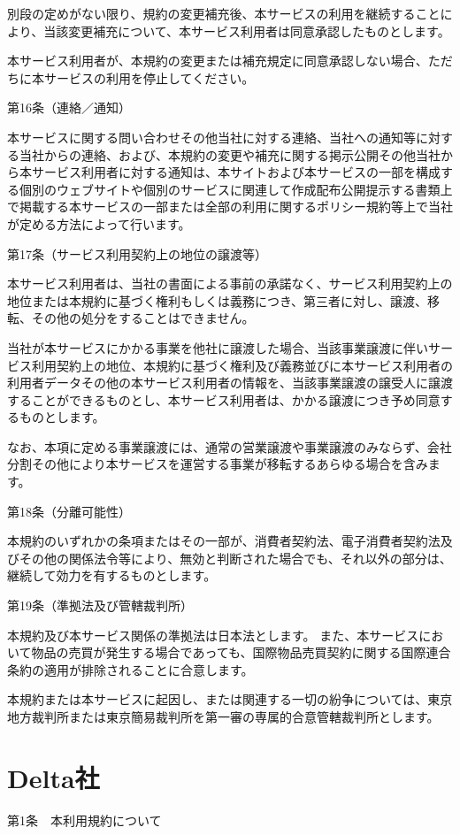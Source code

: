     別段の定めがない限り、規約の変更補充後、本サービスの利用を継続することにより、当該変更補充について、本サービス利用者は同意承認したものとします。

    本サービス利用者が、本規約の変更または補充規定に同意承認しない場合、ただちに本サービスの利用を停止してください。

第16条（連絡／通知）

    本サービスに関する問い合わせその他当社に対する連絡、当社への通知等に対する当社からの連絡、および、本規約の変更や補充に関する掲示公開その他当社から本サービス利用者に対する通知は、本サイトおよび本サービスの一部を構成する個別のウェブサイトや個別のサービスに関連して作成配布公開提示する書類上で掲載する本サービスの一部または全部の利用に関するポリシー規約等上で当社が定める方法によって行います。

第17条（サービス利用契約上の地位の譲渡等）

    本サービス利用者は、当社の書面による事前の承諾なく、サービス利用契約上の地位または本規約に基づく権利もしくは義務につき、第三者に対し、譲渡、移転、その他の処分をすることはできません。

    当社が本サービスにかかる事業を他社に譲渡した場合、当該事業譲渡に伴いサービス利用契約上の地位、本規約に基づく権利及び義務並びに本サービス利用者の利用者データその他の本サービス利用者の情報を、当該事業譲渡の譲受人に譲渡することができるものとし、本サービス利用者は、かかる譲渡につき予め同意するものとします。

    なお、本項に定める事業譲渡には、通常の営業譲渡や事業譲渡のみならず、会社分割その他により本サービスを運営する事業が移転するあらゆる場合を含みます。

第18条（分離可能性）

    本規約のいずれかの条項またはその一部が、消費者契約法、電子消費者契約法及びその他の関係法令等により、無効と判断された場合でも、それ以外の部分は、継続して効力を有するものとします。

第19条（準拠法及び管轄裁判所）

    本規約及び本サービス関係の準拠法は日本法とします。 また、本サービスにおいて物品の売買が発生する場合であっても、国際物品売買契約に関する国際連合条約の適用が排除されることに合意します。

    本規約または本サービスに起因し、または関連する一切の紛争については、東京地方裁判所または東京簡易裁判所を第一審の専属的合意管轄裁判所とします。

\section{Delta社}
第1条　本利用規約について


